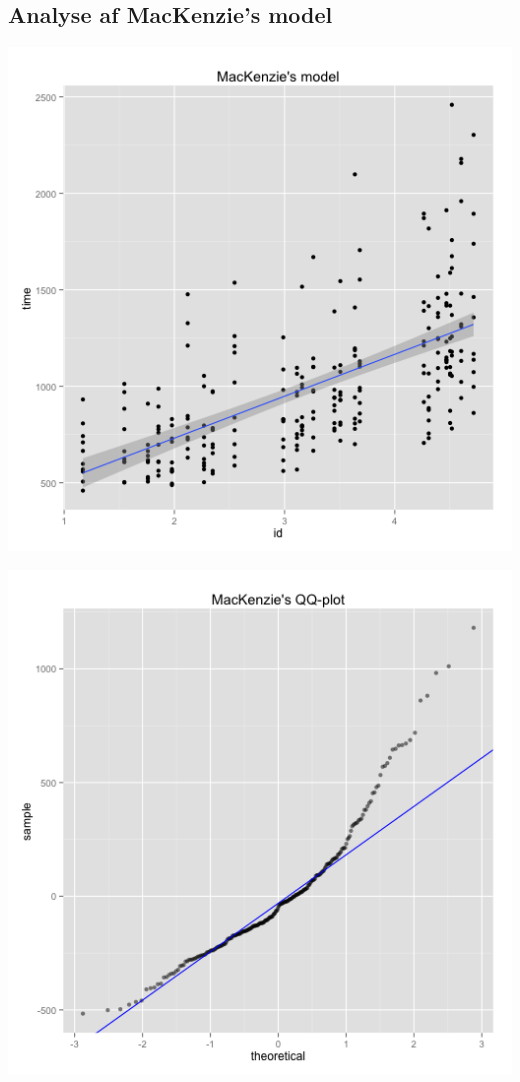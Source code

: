 \subsection*{Analyse af MacKenzie's model}
\begin{minipage}{.5\textwidth}
	\centering
	\includegraphics[width=\textwidth]{images/plots/plot_model_mackenzie}
	\label{fig:plot_model_mackenzie}
\end{minipage}
\begin{minipage}{.5\textwidth}
	\centering
	\includegraphics[width=\textwidth]{images/plots/plot_qq_mackenzie}
	\label{fig:plot_qq_mackenzie}
\end{minipage}

